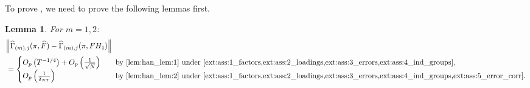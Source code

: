 \documentclass[12pt]{article}
\renewcommand{\marginnote}[2][]{}
\newtheorem{lemma}{Lemma}
\theoremstyle{plain}
\numberwithin{equation}{section}
\begin{document}
To prove , we need to prove the following lemmas first.
\marginnote[j subscripts fixed]{right}
\begin{lemma}
For $m = 1, 2$:
\label{lem:Z_gamma}
\begin{align*}
&\norm{
\widehat{\Gamma}_{(m), j}(\pi, \widehat{F}) - \widehat{\Gamma}_{(m), j}(\pi, F H_{1})
} \\
&= \begin{cases}
\Op{T^{-1/4}} + \OprtN \quad &\text{by \Cref{lem:han_lem:1} under \Cref{ext:ass:1_factors,ext:ass:2_loadings,ext:ass:3_errors,ext:ass:4_ind_groups}}, \\
\Opdelta \quad &\text{by \Cref{lem:han_lem:2} under \Cref{ext:ass:1_factors,ext:ass:2_loadings,ext:ass:3_errors,ext:ass:4_ind_groups,ext:ass:5_error_corr}}.
\end{cases}
\end{align*}
\end{lemma}
\end{document}
